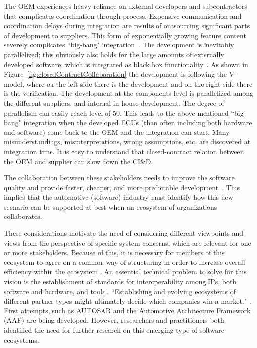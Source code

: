 The OEM experiences heavy reliance on external developers and subcontractors that complicates coordination through process. Expensive communication and coordination delays during integration are results of outsourcing significant parts of development to suppliers. This form of exponentially growing feature content severely complicates ``big-bang" integration~\cite{Eklund2012}. The development is inevitably parallelized; this obviously also holds for the large amounts of externally developed software, which is integrated as black box functionality~\cite{Patrizio2016AAF_Chalmers,Broy2009AAF_TUM,Broy:2006:CAS:1134285.1134292}. 
As shown in Figure~\ref{fig:closedContractCollaboration} the development is following the V-model, where on the left side there is the development and on the right side there is the verification. The development at the components level is parallelized among the different suppliers, and internal in-house development. The degree of parallelism can easily reach level of 50. This leads to the above mentioned ``big bang" integration when the developed ECUs (than often including both hardware and software) come back to the OEM and the integration can start. Many misunderstandings, misinterpretations, wrong assumptions, etc. are discovered at integration time.
It is easy to understand that closed-contract relation between the OEM and supplier can slow down the CI\&D.  

The collaboration between these stakeholders needs to improve the software quality and provide faster, cheaper, and more predictable development~\cite{herbsleb2016IntelligentTransparent}. This implies that the automotive (software) industry must identify how this new scenario can be supported at best when an ecosystem of organizations collaborates.

These considerations motivate the need of considering different viewpoints and views from the perspective of specific system concerns, which are relevant for one or more stakeholders. Because of this, it is necessary for members of this ecosystem to agree on a common way of structuring in order to increase overall efficiency within the ecosystem \cite{Patrizio2016AAF_Chalmers,Broy2009AAF_TUM,Broy:2006:CAS:1134285.1134292}. An essential technical problem to solve for this vision is the establishment of standards for interoperability among IPs, both software and hardware, and tools \cite{Broy:2006:CAS:1134285.1134292}. ``Establishing and evolving ecosystems of different partner types might ultimately decide which companies win a market." \cite{Bosch2016Ecosystem}. First attempts, such as AUTOSAR \cite{acm2008autosar} and the Automotive Architecture Framework (AAF) \cite{Patrizio2016AAF_Chalmers,Broy2009AAF_TUM} are being developed. However, researchers and practitioners both identified the need for further research on this emerging type of software ecosystems.

